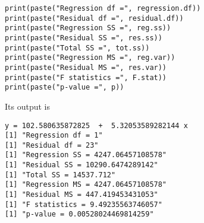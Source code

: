 \documentclass{article}
\begin{document}
\begin{enumerate}
\begin{verbatim}
print(paste("Regression df =", regression.df))
print(paste("Residual df =", residual.df))
print(paste("Regression SS =", reg.ss))
print(paste("Residual SS =", res.ss))
print(paste("Total SS =", tot.ss))
print(paste("Regression MS =", reg.var))
print(paste("Residual MS =", res.var))
print(paste("F statistics =", F.stat))
print(paste("p-value =", p))
\end{verbatim}
Its output is
\begin{verbatim}
y = 102.580635872825  +  5.32053589282144 x
[1] "Regression df = 1"
[1] "Residual df = 23"
[1] "Regression SS = 4247.06457108578"
[1] "Residual SS = 10290.6474289142"
[1] "Total SS = 14537.712"
[1] "Regression MS = 4247.06457108578"
[1] "Residual MS = 447.419453431053"
[1] "F statistics = 9.49235563746057"
[1] "p-value = 0.00528024469814259"
\end{verbatim}
\end{enumerate}
\end{document}
